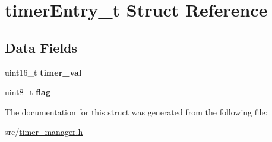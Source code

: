 \hypertarget{structtimer_entry__t}{}\section{timer\+Entry\+\_\+t Struct Reference}
\label{structtimer_entry__t}
\subsection*{Data Fields}
\begin{DoxyCompactItemize}
\item 
uint16\+\_\+t {\bfseries timer\+\_\+val}\hypertarget{structtimer_entry__t_a1912fb18f0e5da0dc0478e4e3b4bf434}{}\label{structtimer_entry__t_a1912fb18f0e5da0dc0478e4e3b4bf434}

\item 
uint8\+\_\+t {\bfseries flag}\hypertarget{structtimer_entry__t_aff31312fb16705aa73c53b945a1a6b30}{}\label{structtimer_entry__t_aff31312fb16705aa73c53b945a1a6b30}

\end{DoxyCompactItemize}


The documentation for this struct was generated from the following file\+:\begin{DoxyCompactItemize}
\item 
src/\hyperlink{timer__manager_8h}{timer\+\_\+manager.\+h}\end{DoxyCompactItemize}
